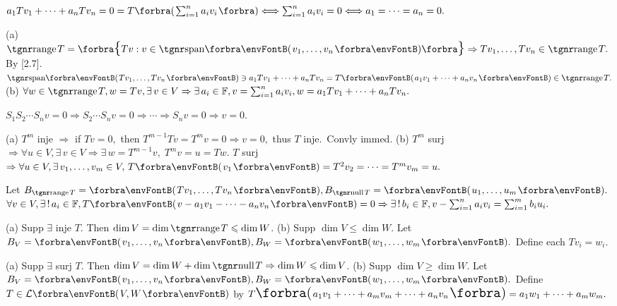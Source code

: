 $a_1 Tv_1+\dots+a_n Tv_n=0=T\BigBigPar{{\sum_{i=1}^n a_i v_i}}\Longleftrightarrow \sum_{i=1}^n a_i v_i=0\Longleftrightarrow a_1=\dots=a_n=0.$\PfEnd
\SepLine

 {
}(a) $\range T=\Bra{Tv:v\in\Span{v_1,\dots,v_n}}\Rightarrow Tv_1,\dots,Tv_n\in\range T.$ By [2.7].\parSol{\Ha}
\Or $\Span{Tv_1,\dots,Tv_n}\ni a_1 Tv_1+\dots+a_n Tv_n=T\Par{a_1 v_1+\dots+a_n v_n}\in\range T.$\parSol{}
(b) $\forall w\in\range T,w=Tv,\exists\,v\in V\Rightarrow\exists\,a_i\in\Fbb,v=\sum_{i=1}^na_i v_i,w=a_1 Tv_1+\dots+a_n Tv_n.$\PfEnd
\SepLine

$S_1S_2\cdots S_nv=0\Rightarrow S_2\cdots S_nv=0\Rightarrow\cdots\Rightarrow S_nv=0\Rightarrow v=0.$\PfEnd
\SepLine

(a) $T^m$ inje $\Rightarrow$ if $Tv=0,$ then $T^{m-1} Tv=T^m v=0\Rightarrow v=0,$ thus $T$ inje. \,Convly immed.\vspace{2pt}\parSol{}
(b) $T^m$ surj $\Rightarrow\forall u\in V,\exists\,v\in V\Rightarrow\exists\,w=T^{m-1}v,\;T^m v=u=Tw.$\parSol{\Hb}
$T$ surj $\Rightarrow\forall u\in V,\exists\,v_1,\dots,v_m\in V,\,T\Par{v_1}=T^2v_2=\cdots=T^m v_m=u.$\PfEnd
\SepLine

Let $B_{\range T}=\Par{Tv_1,\dots,Tv_n},B_{\null T}=\Par{u_1,\dots,u_m}.$\parSol{}
$\forall v\in V,\exists\,!\,a_i\in\Fbb,T\Par{v-a_1 v_1-\dots-a_n v_n}=0\Rightarrow\exists\,!\,b_i\in\Fbb,v-\sum_{i=1}^na_iv_i=\sum_{i=1}^mb_iu_i.$\PfEnd
\SepLine

(a) Supp $\exists$ inje $T$. Then $\dim V=\dim\range T\leqslant\dim W$.\parSol{}
(b) Supp $\dim V\leqslant\dim W.$ Let $B_V=\Par{v_1,\dots,v_n},B_W=\Par{w_1,\dots,w_m}.$ Define each $Tv_i=w_i.$\PfEnd
\SepLine

(a) Supp $\exists$ surj $T$. Then $\dim V=\dim W+\dim\null T\Rightarrow\dim W\leqslant\dim V$.\parSol{}
(b) Supp $\dim V\geqslant\dim W.$ Let $B_V=\Par{v_1,\dots,v_n},B_W=\Par{w_1,\dots,w_m}.$\parSol{\Hb}
Define $T\in\Lm{V,W}$ by $T\BigPar{a_1 v_1+\dots+a_m v_m+\dots+a_n v_n}=a_1 w_1+\dots+a_m w_m.$\PfEnd
\SepLine

